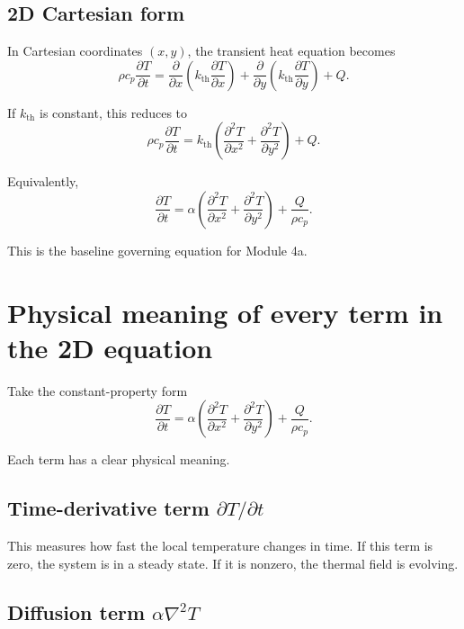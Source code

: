 \documentclass[11pt]{article}
\newcommand{\kth}{k_{\mathrm{th}}}
\begin{document}
\subsection{2D Cartesian form}

In Cartesian coordinates $(x,y)$, the transient heat equation becomes
\begin{equation}
\rho c_p \frac{\partial T}{\partial t}
=
\frac{\partial}{\partial x}\left(\kth \frac{\partial T}{\partial x}\right)
+
\frac{\partial}{\partial y}\left(\kth \frac{\partial T}{\partial y}\right)
+ Q.
\end{equation}

If $\kth$ is constant, this reduces to
\begin{equation}
\rho c_p \frac{\partial T}{\partial t}
=
\kth \left(
\frac{\partial^2 T}{\partial x^2}
+
\frac{\partial^2 T}{\partial y^2}
\right)
+ Q.
\end{equation}

Equivalently,
\begin{equation}
\frac{\partial T}{\partial t}
=
\alpha \left(
\frac{\partial^2 T}{\partial x^2}
+
\frac{\partial^2 T}{\partial y^2}
\right)
+ \frac{Q}{\rho c_p}.
\end{equation}

This is the baseline governing equation for Module 4a.

\section{Physical meaning of every term in the 2D equation}

Take the constant-property form
\begin{equation}
\frac{\partial T}{\partial t}
=
\alpha \left(
\frac{\partial^2 T}{\partial x^2}
+
\frac{\partial^2 T}{\partial y^2}
\right)
+ \frac{Q}{\rho c_p}.
\end{equation}

Each term has a clear physical meaning.

\subsection{Time-derivative term $\partial T/\partial t$}

This measures how fast the local temperature changes in time. If this term is zero, the system is in a steady state. If it is nonzero, the thermal field is evolving.

\subsection{Diffusion term $\alpha \nabla^2 T$}
\end{document}
